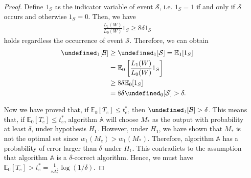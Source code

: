 \documentclass{article}
\newcommand{\E}{\mathbb E}
\let\Pr\undefined
\DeclareMathOperator{\Pr}{Pr}
\begin{document}
\begin{spacing}{1.1}
\begin{proof}
Define $1_S$ as the indicator variable of event $\mathcal S$, i.e. $1_S = 1$ if and only if $\mathcal S$ occurs and otherwise $1_S = 0$.
Then, we have
\begin{align*}
\frac{L_1(W)}{L_0(W)} 1_S \ge 8\delta 1_S
\end{align*}
holds regardless the occurrence of event $\mathcal S$.
Therefore, we can obtain
\begin{align*}
\Pr_1[\mathcal B] &\ge \Pr_1[\mathcal S] = \E_1[1_S] \\
				  &= \E_0\left[\frac{L_1(W)}{L_0(W)} 1_S\right] \\
				  &\ge 8\delta \E_0[1_S] \\
				  &= 8\delta \Pr_0[\mathcal S] > \delta.
\end{align*}

Now we have proved that, if $\E_0[T_e] \le t_e^*$, then $\Pr_1[\mathcal B]>\delta$.
This means that, if $\E_0[T_e] \le t_e^*$, algorithm $\mathbb A$ will choose $M_*$ as the output with probability at least $\delta$, under hypothesis $H_1$.
However, under $H_1$, we have shown that $M_*$ is not the optimal set since $w_1(M_e) > w_1(M_*)$.
Therefore, algorithm $\mathbb A$ has a probability of error larger than $\delta$ under $H_1$. 
This contradicts to the assumption that algorithm $\mathbb A$ is a $\delta$-correct algorithm.
Hence, we must have $\E_0[T_e] > t_e^* = \frac{1}{c\Delta_e^2}\log(1/\delta)$.
\end{proof}



\end{spacing}
\end{document}
